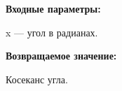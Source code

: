 \textbf{Входные параметры:}

 x --- угол в радианах.

\textbf{Возвращаемое значение:}

Косеканс угла.